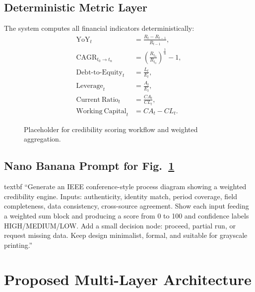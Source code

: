 \documentclass[conference]{IEEEtran}
\begin{document}
\subsection{Deterministic Metric Layer}
The system computes all financial indicators deterministically:
\begin{align}
\mathrm{YoY}_t &= \frac{R_t-R_{t-1}}{R_{t-1}},\\
\mathrm{CAGR}_{t_0\to t_n} &= \left(\frac{R_{t_n}}{R_{t_0}}\right)^{\frac{1}{n}}-1,\\
\mathrm{Debt\text{-}to\text{-}Equity}_t &= \frac{L_t}{E_t},\\
\mathrm{Leverage}_t &= \frac{A_t}{E_t},\\
\mathrm{Current\ Ratio}_t &= \frac{CA_t}{CL_t},\\
\mathrm{Working\ Capital}_t &= CA_t-CL_t.
\end{align}

\begin{figure}[t]
\centering
{}
\caption{Placeholder for credibility scoring workflow and weighted aggregation.}
\label{fig:credibility_placeholder}
\end{figure}

\subsection{Nano Banana Prompt for Fig.~\ref{fig:credibility_placeholder}}
\csname textbf ``Generate an IEEE conference-style process diagram showing a weighted credibility engine. Inputs: authenticity, identity match, period coverage, field completeness, data consistency, cross-source agreement. Show each input feeding a weighted sum block and producing a score from 0 to 100 and confidence labels HIGH/MEDIUM/LOW. Add a small decision node: proceed, partial run, or request missing data. Keep design minimalist, formal, and suitable for grayscale printing.''

\section{Proposed Multi-Layer Architecture}
\end{document}
